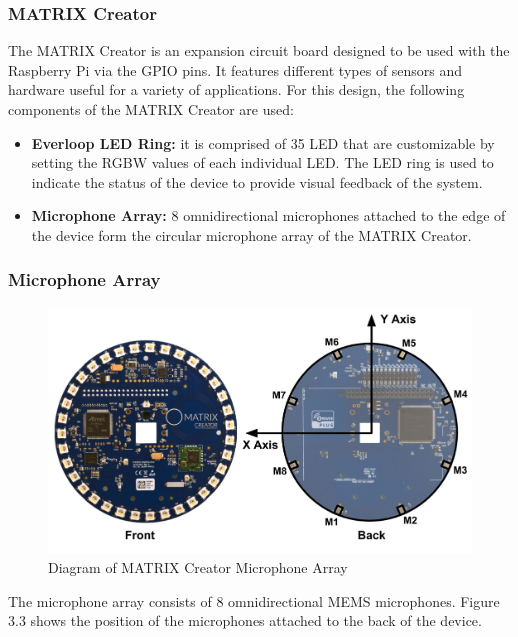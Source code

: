 \documentclass[hidelinks,12pt]{report} %
\begin{document}
\subsubsection{MATRIX Creator}

The MATRIX Creator is an expansion circuit board designed to be used with the Raspberry Pi via the GPIO pins. It features different types of sensors and hardware useful for a variety of applications. For this design, the following components of the MATRIX Creator are used:

	\begin{itemize}
		\item{\textbf{Everloop LED Ring: }}
		it is comprised of 35 LED that are customizable by setting the RGBW values of each individual LED. The LED ring is used to indicate the status of the device to provide visual feedback of the system.
	
		\item{\textbf{Microphone Array: }}
		8 omnidirectional microphones attached to the edge of the device form the circular microphone array of the MATRIX Creator. 
	
		
	\end{itemize}

\subsubsection{Microphone Array}

\begin{figure}[h]
\centering
\includegraphics[scale = 0.4]{fig3.3} 
\caption{Diagram of MATRIX Creator Microphone Array}
\label{fig}
\end{figure}

The microphone array consists of 8 omnidirectional MEMS microphones. Figure 3.3 shows the position of the microphones attached to the back of the device. 
\end{document}
